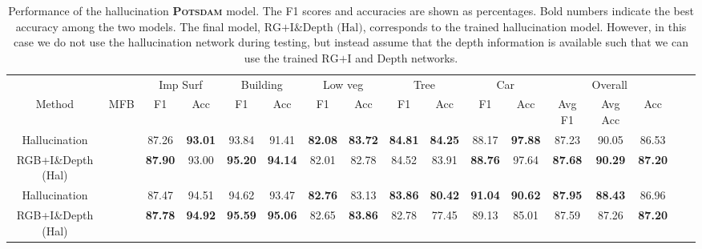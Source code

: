 \documentclass[journal]{IEEEtran}
\newcommand{\cmark}{\ding{51}}%
\newcommand{\xmark}{\ding{55}}%
\begin{document}
\begin{table*}[t]
\begin{center}
\begin{tabular}{lc|c|c|c|c|c|c|c|c|c|c|c|c|c|c|c|}
\cline{3-15}
& & \multicolumn{2}{|c|}{Imp Surf} & \multicolumn{2}{c|}{Building} & \multicolumn{2}{c|}{Low veg} & \multicolumn{2}{c|}{Tree} & \multicolumn{2}{c|}{Car} & \multicolumn{3}{c|}{Overall}\\
\cline{1-15}
\multicolumn{1}{|c|}{Method} & \multicolumn{1}{|c|}{MFB} & F1 & Acc & F1 & Acc & F1 & Acc & F1 & Acc & F1 & Acc & Avg F1 & Avg Acc & Acc\\
\hline\hline
\multicolumn{1}{|c|}{Hallucination} & \cmark & 87.26 & {\bf93.01} & 93.84 & 91.41 & {\bf82.08} & {\bf83.72} & {\bf84.81} & {\bf84.25} & 88.17 & {\bf97.88} & 87.23 & 90.05 & 86.53\\
\hline
\multicolumn{1}{|c|}{RGB+I\&Depth (Hal)} & \cmark & {\bf87.90} & 93.00 & {\bf95.20} & {\bf94.14} & 82.01 & 82.78 & 84.52 & 83.91 & {\bf88.76} & 97.64 & {\bf87.68} & {\bf90.29} & {\bf87.20} \\
\hline
\hline
\multicolumn{1}{|c|}{Hallucination} & \xmark & 87.47 & 94.51 & 94.62 & 93.47 & {\bf82.76} & 83.13 & {\bf83.86} & {\bf80.42} & {\bf91.04} & {\bf90.62} & {\bf87.95} & {\bf88.43} & 86.96\\
\hline
\multicolumn{1}{|c|}{RGB+I\&Depth (Hal)} & \xmark & {\bf87.78} & {\bf94.92} & {\bf95.59} & {\bf95.06} & 82.65 & {\bf83.86} & 82.78 & 77.45 & 89.13 & 85.01 & 87.59 & 87.26 & {\bf87.20} \\
\hline
\end{tabular}
\vspace{0.2cm}
\caption{Performance of the hallucination {\bf\scshape Potsdam} model. The F1 scores and accuracies are shown as percentages. Bold numbers indicate the best accuracy among the two models. The final model, $\text{RG+I\&Depth (Hal)}$, corresponds to the trained hallucination model. However, in this case we do not use the hallucination network during testing, but instead assume that the depth information is available such that we can use the trained $\text{RG+I}$ and $\text{Depth}$ networks.}
\label{tab:resultsHallucinationPotsdam}
\end{center}
\end{table*}

\end{document}
